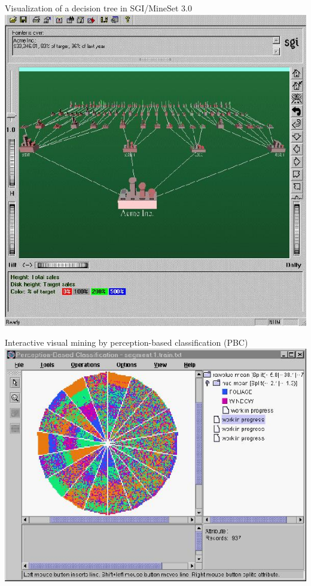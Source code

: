 \documentclass[aspectratio=169,t,table]{beamer}
\begin{document}
  {
    \begin{frame}{Visualization of a decision tree in SGI/MineSet 3.0}
      \centering
      \includegraphics[height=0.9\textheight]{img/classification2.jpeg}
    \end{frame}
  }

  {
    \begin{frame}{Interactive visual mining by perception-based classification (PBC)}
      \centering
      \includegraphics[height=0.9\textheight]{img/classification3.jpeg}
    \end{frame}
  }
\end{document}
